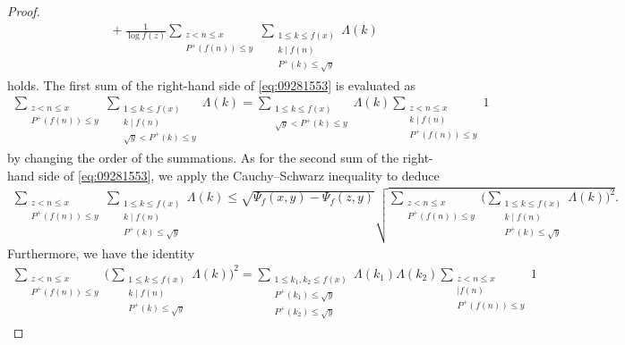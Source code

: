\documentclass[a4paper,11pt]{amsart}
\theoremstyle{definition}
\numberwithin{equation}{section}
\begin{document}
\begin{proof}
\begin{align}
&\quad
+ \frac{1}{\log{f(z)}}
\sum_{\substack{z<n \leq x \\ P^+(f(n)) \leq y}} 
\sum_{\substack{1 \leq k \leq f(x) \\ k \mid f(n) \\ P^+(k) \leq \sqrt{y}}} \Lambda(k) \nonumber 
\end{align}
holds. 
The first sum of the right-hand side of \eqref{eq:09281553} is evaluated as 
\begin{align}\label{eq:09281558}
\sum_{\substack{z<n \leq x \\ P^+(f(n)) \leq y}} 
\sum_{\substack{1 \leq k \leq f(x) \\ k \mid f(n) \\ \sqrt{y} < P^+(k) \leq y}} \Lambda(k)
= \sum_{\substack{1 \leq k \leq f(x) \\ \sqrt{y} < P^+(k) \leq y}} \Lambda(k)
\sum_{\substack{z<n \leq x \\ k \mid f(n) \\ P^+(f(n)) \leq y}} 1
\end{align}
by changing the order of the summations. 
As for the second sum of the right-hand side of \eqref{eq:09281553}, we apply the Cauchy--Schwarz inequality to deduce
\begin{align*}
\sum_{\substack{z<n \leq x \\ P^+(f(n)) \leq y}} 
\sum_{\substack{1 \leq k \leq f(x) \\ k \mid f(n) \\ P^+(k) \leq \sqrt{y}}} \Lambda(k)
\leq \sqrt{\Psi_f(x,y)-\Psi_f(z,y)}
\sqrt{\sum_{\substack{z<n \leq x \\ P^+(f(n)) \leq y}} 
\Bigg(\sum_{\substack{1 \leq k \leq f(x) \\ k \mid f(n) \\ P^+(k) \leq \sqrt{y}}} \Lambda(k)\Bigg)^2}. 
\end{align*}
Furthermore, we have the identity
\begin{align*}
\sum_{\substack{z<n \leq x \\ P^+(f(n)) \leq y}} 
\Bigg(\sum_{\substack{1 \leq k \leq f(x) \\ k \mid f(n) \\ P^+(k) \leq \sqrt{y}}} \Lambda(k)\Bigg)^2
= \sum_{\substack{1 \leq k_1,k_2 \leq f(x) \\ P^+(k_1) \leq \sqrt{y} \\ P^+(k_2) \leq \sqrt{y}}} \Lambda(k_1) \Lambda(k_2)
\sum_{\substack{z<n \leq x \\ [k_1,k_2] \mid f(n) \\ P^+(f(n)) \leq y}} 1

\end{align*}
\end{proof}
\end{document}
